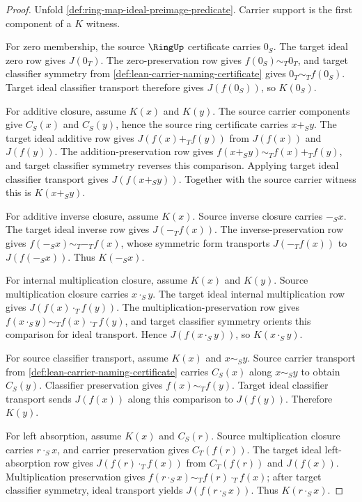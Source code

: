 \begin{proof}
Unfold \autoref{def:ring-map-ideal-preimage-predicate}. Carrier support is the first component of a $K$ witness.

For zero membership, the source $\RingUp$ certificate carries $0_S$. The target ideal zero row gives $J(0_T)$. The zero-preservation row gives $f(0_S)\sim_T0_T$, and target classifier symmetry from \autoref{def:lean-carrier-naming-certificate} gives $0_T\sim_T f(0_S)$. Target ideal classifier transport therefore gives $J(f(0_S))$, so $K(0_S)$.

For additive closure, assume $K(x)$ and $K(y)$. The source carrier components give $C_S(x)$ and $C_S(y)$, hence the source ring certificate carries $x+_S y$. The target ideal additive row gives $J(f(x)+_T f(y))$ from $J(f(x))$ and $J(f(y))$. The addition-preservation row gives $f(x+_S y)\sim_T f(x)+_T f(y)$, and target classifier symmetry reverses this comparison. Applying target ideal classifier transport gives $J(f(x+_S y))$. Together with the source carrier witness this is $K(x+_S y)$.

For additive inverse closure, assume $K(x)$. Source inverse closure carries $-_S x$. The target ideal inverse row gives $J(-_T f(x))$. The inverse-preservation row gives $f(-_S x)\sim_T -_T f(x)$, whose symmetric form transports $J(-_T f(x))$ to $J(f(-_S x))$. Thus $K(-_S x)$.

For internal multiplication closure, assume $K(x)$ and $K(y)$. Source multiplication closure carries $x\cdot_S y$. The target ideal internal multiplication row gives $J(f(x)\cdot_T f(y))$. The multiplication-preservation row gives $f(x\cdot_S y)\sim_T f(x)\cdot_T f(y)$, and target classifier symmetry orients this comparison for ideal transport. Hence $J(f(x\cdot_S y))$, so $K(x\cdot_S y)$.

For source classifier transport, assume $K(x)$ and $x\sim_S y$. Source carrier transport from \autoref{def:lean-carrier-naming-certificate} carries $C_S(x)$ along $x\sim_S y$ to obtain $C_S(y)$. Classifier preservation gives $f(x)\sim_T f(y)$. Target ideal classifier transport sends $J(f(x))$ along this comparison to $J(f(y))$. Therefore $K(y)$.

For left absorption, assume $K(x)$ and $C_S(r)$. Source multiplication closure carries $r\cdot_S x$, and carrier preservation gives $C_T(f(r))$. The target ideal left-absorption row gives $J(f(r)\cdot_T f(x))$ from $C_T(f(r))$ and $J(f(x))$. Multiplication preservation gives $f(r\cdot_S x)\sim_T f(r)\cdot_T f(x)$; after target classifier symmetry, ideal transport yields $J(f(r\cdot_S x))$. Thus $K(r\cdot_S x)$.


\end{proof}

